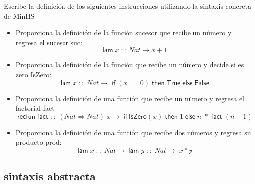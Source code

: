     \begin{exercise}
    Escribe la definición de los siguientes instrucciones utilizando la sintaxis concreta de \textsf{MinHS}\\

	\begin{itemize}
		\item Proporciona la definición de la función sucesor que recibe un número y regresa el sucesor \textsf{suc}: 
			$$ \textsf{lam}\; x\;::\; \textit{Nat} \rightarrow x + 1$$
		\item Proporciona la definición de la función que recibe un número y decide si es zero \textsf{IsZero}:
			 $$ \textsf{lam}\; x\;::\; \textit{Nat} \rightarrow\; \textsf{if}\; (x\; =\; 0) \; \textsf{then}\; \textsf{True}\; \textsf{else}\; \textsf{False}$$
		\item Proporciona la definición de una función que recibe un número y regresa el factorial \textsf{fact}
			 $$ \textsf{recfun}\; \textsf{fact}\; ::\; (\textit{Nat} \Rightarrow \textit{Nat})\; x \rightarrow\; \textsf{if}\; \textsf{IsZero}(x)\; \textsf{then}\; 1\; \textsf{else}\; n\; *\; \textsf{fact}\; (n-1)$$
		\item Proporciona la definición de una función que recibe dos números y regresa su producto \textsf{prod}:
			$$ \textsf{lam}\; x\; ::\; Nat \rightarrow\; \textsf{lam}\; y\; ::\; Nat \rightarrow\; x*y$$
	\end{itemize}

    \end{exercise}

\subsection{sintaxis abstracta}

